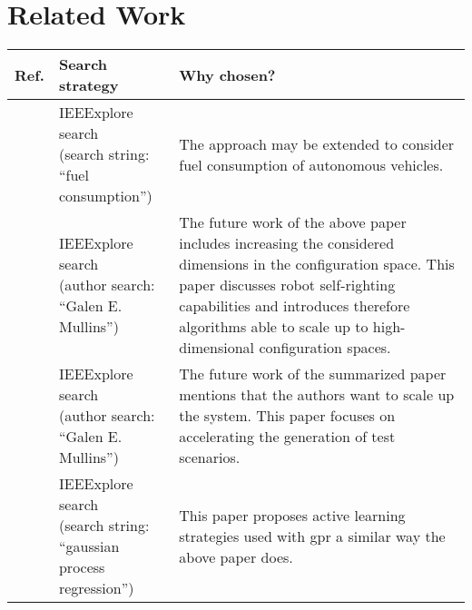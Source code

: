 \documentclass[oneside, notitlepage, twocolumn]{scrartcl}
\newcommand{\tableheadline}[1]{\textbf{#1}}
\begin{document}
\section{Related Work}
\begin{adjustbox}{angle=90}
\begin{tabularx}{\textwidth}{llX}
    \tableheadline{Ref.} & \tableheadline{Search strategy} & \tableheadline{Why chosen?}\\
    \midrule
    \cite{trucksFuel} & \makecell{IEEExplore search\\(search string:\\``fuel consumption'')} & The approach may be extended to consider fuel consumption of autonomous vehicles.\\
    \midrule
    \cite{higherDims} & \makecell{IEEExplore search\\(author search:\\``Galen E. Mullins'')}& The future work of the above paper includes increasing the considered dimensions in the configuration space.
        This paper discusses robot self-righting capabilities and introduces therefore algorithms able to scale up to high-dimensional configuration spaces.\\
    \midrule
    \cite{accelerate} & \makecell{IEEExplore search\\(author search:\\``Galen E. Mullins'')} & The future work of the summarized paper mentions that the authors want to scale up the system.
    This paper focuses on accelerating the generation of test scenarios.\\
    \midrule
    \cite{gpr} & \makecell{IEEExplore search\\(search string:\\``gaussian process regression'')}& This paper proposes active learning strategies used with \gls{gpr} a similar way the above paper does.\\
\end{tabularx}
\end{adjustbox}
\end{document}
